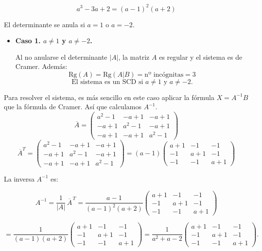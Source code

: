 \documentclass[a4paper,12pt]{article}
\begin{document}
\begin{ejercicio}[title=Ejercicio 31]
$$a^3 - 3a + 2 = (a-1)^2(a+2)$$

El determinante se anula si $a=1$ o $a=-2$.

\begin{itemize}
    \item \textbf{Caso 1. $a \neq 1$ y $a \neq -2$.}
    
Al no anularse el determinante $|{A}|$, la matriz ${A}$ es regular y el sistema es de Cramer. Además:
\[
\text{Rg}({A}) = \text{Rg}({A}|{B}) = \text{nº incógnitas} = 3
\]
\[
\boxed{\text{El sistema es un SCD si } a \ne 1 \text{ y } a \ne -2.}
\]
\end{itemize}
\end{ejercicio}
\begin{ejercicio}[title=Ejercicio 31]
\begin{itemize}
Para resolver el sistema, es más sencillo en este caso aplicar la fórmula ${X} = {A}^{-1} {B}$ que la fórmula de Cramer. Así que calculamos $A^{-1}$.
$$\overline{A} =
\begin{pmatrix}
a^2-1 & -a+1 & -a+1\\
-a+1 & a^2-1 & -a+1\\
-a+1 & -a+1 & a^2-1
\end{pmatrix}$$
$$\overline{{A}}^T =
\begin{pmatrix}
a^2-1 & -a+1 & -a+1\\
-a+1 & a^2-1 & -a+1\\
-a+1 & -a+1 & a^2-1
\end{pmatrix} = (a-1)
\begin{pmatrix}
a+1 & -1 & -1\\
-1 & a+1 & -1\\
-1 & -1 & a+1
\end{pmatrix}$$
\[\]

La inversa $A^{-1}$ es:

\[
A^{-1}
= \frac{1}{|A|}\,\overline{A}^{\,T}
= \frac{a-1}{(a-1)^2(a+2)}
\begin{pmatrix}
a+1 & -1 & -1\\
-1 & a+1 & -1\\
-1 & -1 & a+1
\end{pmatrix}
\]

\[
= \frac{1}{(a-1)(a+2)}
\begin{pmatrix}
a+1 & -1 & -1\\
-1 & a+1 & -1\\
-1 & -1 & a+1
\end{pmatrix}
= \frac{1}{a^2 + a - 2}
\begin{pmatrix}
a+1 & -1 & -1\\
-1 & a+1 & -1\\
-1 & -1 & a+1
\end{pmatrix}.
\]
\[\]


\end{itemize}
\end{ejercicio}
\end{document}
